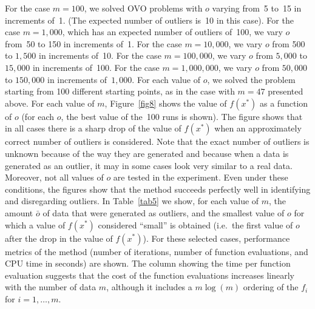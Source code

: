 \documentclass[11pt]{article}
\begin{document}
For the case $m=100$, we solved OVO problems with $o$ varying from~5 to~15 in increments of~1. (The expected number of outliers is~10 in this case). For the case $m=1{,}000$, which has an expected number of outliers of~100, we vary $o$ from~50 to 150 in increments of~1. For the case $m=10{,}000$, we vary $o$ from 500 to $1{,}500$ in increments of~10. For the case $m=100{,}000$, we vary $o$ from $5{,}000$ to $15{,}000$ in increments of~100. For the case $m=1{,}000{,}000$, we vary $o$ from $50{,}000$ to $150{,}000$ in increments of~$1{,}000$. For each value of $o$, we solved the problem starting from 100 different starting points, as in the case with $m=47$ presented above. For each value of $m$, Figure~\ref{fig8} shows the value of $f(x^*)$ as a function of $o$ (for each $o$, the best value of the~100 runs is shown). The figure shows that in all cases there is a sharp drop of the value of $f(x^*)$ when an approximately correct number of outliers is considered. Note that the exact number of outliers is unknown because of the way they are generated and because when a data is generated as an outlier, it may in some cases look very similar to a real data. Moreover, not all values of $o$ are tested in the experiment. Even under these conditions, the figures show that the method succeeds perfectly well in identifying and disregarding outliers. In Table~\ref{tab5} we show, for each value of $m$, the amount $\bar o$ of data that were generated as outliers, and the smallest value of $o$ for which a value of $f(x^*)$ considered ``small'' is obtained (i.e.\ the first value of $o$ after the drop in the value of $f(x^*)$). For these selected cases, performance metrics of the method (number of iterations, number of function evaluations, and CPU time in seconds) are shown. The column showing the time per function evaluation suggests that the cost of the function evaluations increases linearly with the number of data $m$, although it includes a $m \log(m)$ ordering of the $f_i$ for $i=1,\dots,m$.
\end{document}
